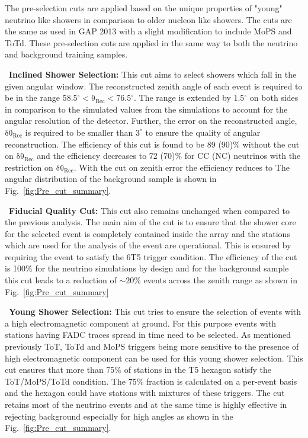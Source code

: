 The pre-selection cuts are applied based on the unique properties of "young" neutrino like showers in comparison to older nucleon like showers. The cuts are the same as used in GAP 2013 with a slight modification to include MoPS and ToTd. These pre-selection cuts are applied in the same way to both the neutrino and background training samples. 
\begin{description}
  \item ~\textbf{Inclined Shower Selection:} This cut aims to select showers which fall in the given angular window. The reconstructed zenith angle of each event is required to be in the range 58.5$^{\circ} < \mathrm{\theta_{Rec} < 76.5^{\circ}}$. The range is extended by 1.5$^\circ$ on both sides in comparison to the simulated values from the simulations to account for the angular resolution of the detector. Further, the error on the reconstructed angle, $\mathrm{\delta \theta_{\text{Rec}}}$ is required to be smaller than $3^\circ$ to ensure the quality of angular reconstruction. The efficiency of this cut is found to be 89 (90)\% without the cut on $\mathrm{\delta \theta_{\text{Rec}}}$ and the efficiency decreases to 72 (70)\% for CC (NC) neutrinos with the restriction on $\mathrm{\delta \theta_{\text{Rec}}}$. With the cut on zenith error the efficiency reduces to  The angular distribution of the background sample is shown in Fig.~\ref{fig:Pre_cut_summary}.
  \item ~\textbf{Fiducial Quality Cut:} This cut also remains unchanged when compared to the previous analysis. The main aim of the cut is to ensure that the shower core for the selected event is completely contained inside the array and the stations which are used for the analysis of the event are operational. This is ensured by requiring the event to satisfy the 6T5 trigger condition. The efficiency of the cut is 100\% for the neutrino simulations by design and for the background sample this cut leads to a reduction of $\sim 20\%$ events across the zenith range as shown in Fig.~\ref{fig:Pre_cut_summary}   
  \item ~\textbf{Young Shower Selection:} This cut tries to ensure the selection of events with a high electromagnetic component at ground. For this purpose events with stations having FADC traces spread in time need to be selected. As mentioned previously ToT, ToTd and MoPS triggers being more sensitive to the presence of high electromagnetic component can be used for this young shower selection. This cut ensures that more than 75\% of stations in the T5 hexagon satisfy the ToT/MoPS/ToTd condition. The 75\% fraction is calculated on a per-event basis and the hexagon could have stations with mixtures of these triggers. The cut retains most of the neutrino events and at the same time is highly effective in rejecting background especially for high angles as shown in the Fig.~\ref{fig:Pre_cut_summary}.
  

\end{description}
